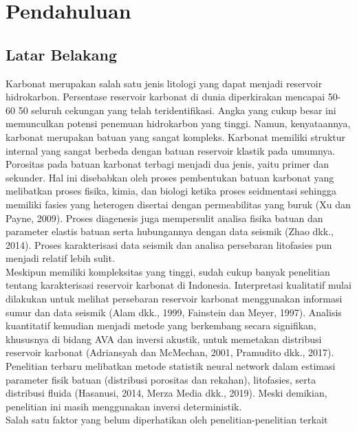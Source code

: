 \documentclass[main.tex]{subfiles}
\begin{document}
\noindent
\chapter{Pendahuluan}
\section{Latar Belakang}
Karbonat merupakan salah satu jenis litologi yang dapat menjadi reservoir
hidrokarbon. Persentase reservoir karbonat di dunia diperkirakan mencapai 50-
60%
50%
seluruh cekungan yang telah teridentifikasi. Angka yang cukup besar ini
memunculkan potensi penemuan hidrokarbon yang tinggi. Namun, kenyataannya,
karbonat merupakan batuan yang sangat kompleks. Karbonat memiliki struktur
internal yang sangat berbeda dengan batuan reservoir klastik pada umumnya.
Porositas pada batuan karbonat terbagi menjadi dua jenis, yaitu primer dan
sekunder. Hal ini disebabkan oleh proses pembentukan batuan karbonat yang
melibatkan proses fisika, kimia, dan biologi ketika proses seidmentasi sehingga
memiliki fasies yang heterogen disertai dengan permeabilitas yang buruk (Xu dan
Payne, 2009). Proses diagenesis juga mempersulit analisa fisika batuan dan
parameter elastis batuan serta hubungannya dengan data seismik (Zhao dkk.,
2014). Proses karakterisasi data seismik dan analisa persebaran litofasies pun
menjadi relatif lebih sulit.\\
\newline
Meskipun memiliki kompleksitas yang tinggi, sudah cukup banyak penelitian
tentang karakterisasi reservoir karbonat di Indonesia. Interpretasi kualitatif mulai
dilakukan untuk melihat persebaran reservoir karbonat menggunakan informasi
sumur dan data seismik (Alam dkk., 1999, Fainstein dan Meyer, 1997). Analisis
kuantitatif kemudian menjadi metode yang berkembang secara signifikan,
khususnya di bidang AVA dan inversi akustik, untuk memetakan distribusi
reservoir karbonat (Adriansyah dan McMechan, 2001, Pramudito dkk., 2017).
Penelitian terbaru melibatkan metode statistik neural network dalam estimasi
parameter fisik batuan (distribusi porositas dan rekahan), litofasies, serta distribusi
fluida (Hasanusi, 2014, Merza Media dkk., 2019). Meski demikian, penelitian ini
masih menggunakan inversi deterministik.\\
\newline
Salah satu faktor yang belum diperhatikan oleh penelitian-penelitian terkait
\end{document}
